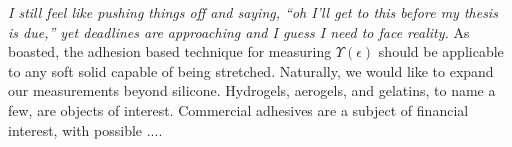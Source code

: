 \emph{I still feel like pushing things off and saying, ``oh I'll get to this before my thesis is due,'' yet deadlines are approaching and I guess I need to face reality.} As boasted, the adhesion based technique for measuring $\Upsilon(\epsilon)$ should be applicable to any soft solid capable of being stretched. Naturally, we would like to expand our measurements beyond silicone. Hydrogels, aerogels, and gelatins, to name a few, are objects of interest. Commercial adhesives are a subject of financial interest, with possible .... 